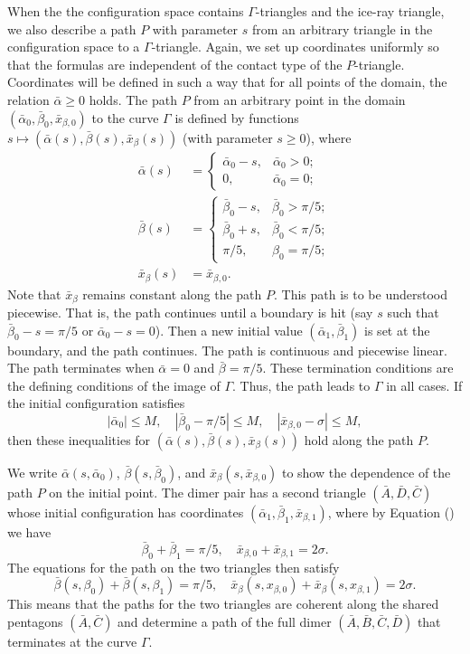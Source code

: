 When the the configuration space contains $\Gamma$-triangles and
the ice-ray triangle, we also
describe a path $P$ with parameter $s$ from an arbitrary triangle in
the configuration space to a $\Gamma$-triangle.  Again, we set up
coordinates uniformly so that the formulas are independent of the
contact type of the $P$-triangle.  Coordinates will be defined in such
a way that for all points of the domain, the relation $\bar\alpha\ge
0$ holds.  The path $P$ from an arbitrary point in the domain
$(\bar\alpha_0,\bar\beta_0,\bar x_{\beta,0})$ to the curve $\Gamma$ is
defined by functions $s\mapsto (\bar\alpha(s),\bar\beta(s),\bar
x_\beta(s))$ (with parameter $s\ge 0$), where
\begin{align*}
\bar\alpha(s) &= \begin{cases}
\bar\alpha_0 - s, & \bar\alpha_0 > 0;\\
0, &\bar\alpha_0=0;
\end{cases}\\
\bar\beta(s) &= \begin{cases}
\bar\beta_0 - s, & \bar\beta_0 > \pi/5;\\
\bar\beta_0 + s, & \bar\beta_0 < \pi/5;\\
\pi/5, &\beta_0=\pi/5;
\end{cases}\\
\bar x_\beta(s) &= \bar x_{\beta,0}.
\end{align*}
Note that $\bar x_\beta$ remains constant along the path $P$.  This
path is to be understood piecewise.  That is, the path continues until
a boundary is hit (say $s$ such that $\bar\beta_0-s = \pi/5$ or
$\bar\alpha_0-s = 0$).  Then a new initial value
$(\bar\alpha_1,\bar\beta_1)$ is set at the boundary, and the path
continues.  The path is continuous and piecewise linear.  The path
terminates when $\bar\alpha = 0$ and $\bar\beta = \pi/5$.  These
termination conditions are the defining conditions of the image of
$\Gamma$.  Thus, the path leads to $\Gamma$ in all cases.
If the initial configuration satisfies
\[
|\bar\alpha_0|\le M,\quad 
|\bar\beta_0-\pi/5|\le M,\quad |\bar x_{\beta,0}-\sigma|\le M,
\]
then these inequalities for $(\bar\alpha(s),\bar\beta(s),\bar
x_\beta(s))$ hold along the path $P$.

We write $\bar\alpha(s,\bar\alpha_0)$, $\bar\beta(s,\bar\beta_0)$, and
$\bar x_\beta(s,\bar x_{\beta,0})$ to show the dependence of the path
$P$ on the initial point.  The dimer pair has a second triangle $(\bar
A,\bar D,\bar C)$ whose initial configuration has coordinates
$(\bar\alpha_1,\bar\beta_1,\bar x_{\beta,1})$, where by Equation
() we have
\[
\bar\beta_0+\bar\beta_1 = \pi/5,\quad 
\bar x_{\beta,0}+\bar x_{\beta,1} = 2\sigma.
\]
The equations for the path on the two triangles then satisfy
\[
\bar\beta(s,\beta_0)+\bar\beta(s,\beta_1)=\pi/5,\quad
\bar x_{\beta}(s,x_{\beta,0}) + \bar x_{\beta}(s,x_{\beta,1}) = 2\sigma.
\]
This means that the paths for the two triangles are coherent along the
shared pentagons $(\bar A,\bar C)$ and determine a path of the full
dimer $(\bar A,\bar B,\bar C,\bar D)$ that terminates at the curve
$\Gamma$.



